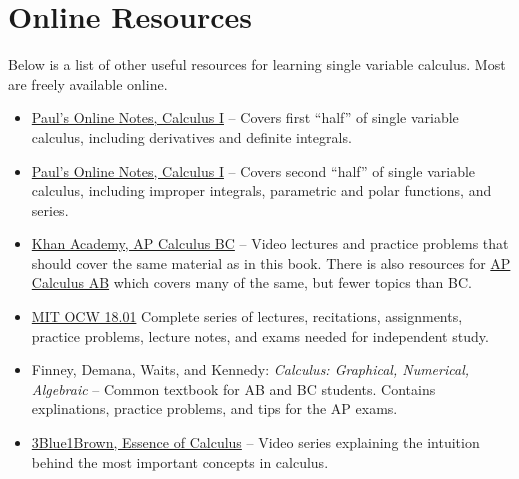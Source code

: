 \section{Online Resources}
Below is a list of other useful resources for learning single variable calculus.
Most are freely available online.

\begin{itemize}
	\item \href{https://tutorial.math.lamar.edu/Classes/CalcI/CalcI.aspx}{Paul's Online Notes, Calculus I} -- Covers first ``half'' of single variable calculus, including derivatives and definite integrals.
	\item \href{https://tutorial.math.lamar.edu/Classes/CalcII/CalcII.aspx}{Paul's Online Notes, Calculus I} -- Covers second ``half'' of single variable calculus, including improper integrals, parametric and polar functions, and series.
	\item \href{https://www.khanacademy.org/math/ap-calculus-bc}{Khan Academy, AP Calculus BC} -- Video lectures and practice problems that should cover the same material as in this book.
		There is also resources for \href{https://www.khanacademy.org/math/ap-calculus-ab}{AP Calculus AB} which covers many of the same, but fewer topics than BC.
	\item \href{https://ocw.mit.edu/courses/mathematics/18-01sc-single-variable-calculus-fall-2010/}{MIT OCW 18.01} Complete series of lectures, recitations, assignments, practice problems, lecture notes, and exams needed for independent study.
	\item Finney, Demana, Waits, and Kennedy: \textit{Calculus: Graphical, Numerical, Algebraic} -- Common textbook for AB and BC students.
		Contains explinations, practice problems, and tips for the AP exams.
	\item \href{https://www.youtube.com/playlist?list=PLZHQObOWTQDMsr9K-rj53DwVRMYO3t5Yr}{3Blue1Brown, Essence of Calculus} -- Video series explaining the intuition behind the most important concepts in calculus.
\end{itemize}